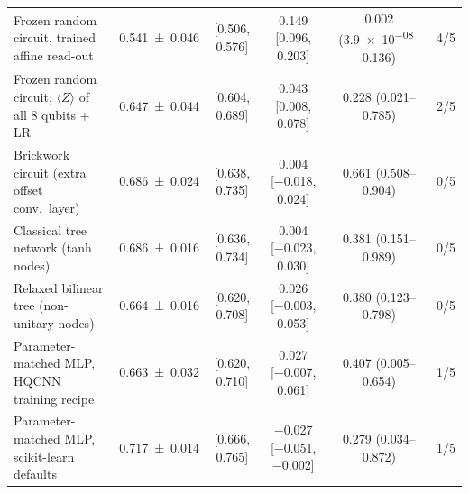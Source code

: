 \begin{table}[tbp]
\begin{tabular}{>{\raggedright\arraybackslash}p{3.6cm}ccccc}
Frozen random circuit, trained affine read-out & \num{0.541 \pm 0.046} & [\num{0.506}, \num{0.576}] & \num{+0.149} [\num{+0.096}, \num{+0.203}] & \num{0.002} (\num{3.9e-08}--\num{0.136}) & \num{4}/\num{5} \\
Frozen random circuit, $\langle Z\rangle$ of all 8 qubits + LR & \num{0.647 \pm 0.044} & [\num{0.604}, \num{0.689}] & \num{+0.043} [\num{+0.008}, \num{+0.078}] & \num{0.228} (\num{0.021}--\num{0.785}) & \num{2}/\num{5} \\
Brickwork circuit (extra offset conv.\ layer) & \num{0.686 \pm 0.024} & [\num{0.638}, \num{0.735}] & \num{+0.004} [\num{-0.018}, \num{+0.024}] & \num{0.661} (\num{0.508}--\num{0.904}) & \num{0}/\num{5} \\
Classical tree network (tanh nodes) & \num{0.686 \pm 0.016} & [\num{0.636}, \num{0.734}] & \num{+0.004} [\num{-0.023}, \num{+0.030}] & \num{0.381} (\num{0.151}--\num{0.989}) & \num{0}/\num{5} \\
Relaxed bilinear tree (non-unitary nodes) & \num{0.664 \pm 0.016} & [\num{0.620}, \num{0.708}] & \num{+0.026} [\num{-0.003}, \num{+0.053}] & \num{0.380} (\num{0.123}--\num{0.798}) & \num{0}/\num{5} \\
Parameter-matched MLP, HQCNN training recipe & \num{0.663 \pm 0.032} & [\num{0.620}, \num{0.710}] & \num{+0.027} [\num{-0.007}, \num{+0.061}] & \num{0.407} (\num{0.005}--\num{0.654}) & \num{1}/\num{5} \\
Parameter-matched MLP, scikit-learn defaults & \num{0.717 \pm 0.014} & [\num{0.666}, \num{0.765}] & \num{-0.027} [\num{-0.051}, \num{-0.002}] & \num{0.279} (\num{0.034}--\num{0.872}) & \num{1}/\num{5} \\
\bottomrule
\end{tabular}
\par{}
\end{table}
